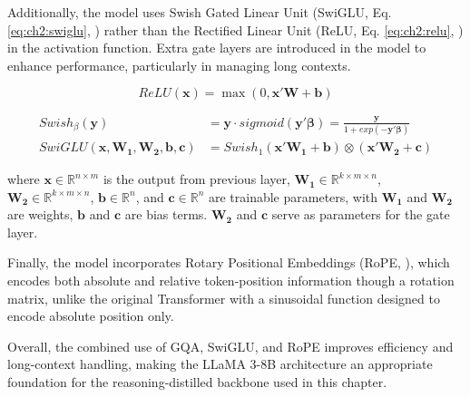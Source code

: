 Additionally, the model uses Swish Gated Linear Unit (SwiGLU, Eq. \eqref{eq:ch2:swiglu}, \cite{shazeer2020glu}) rather than the Rectified Linear Unit (ReLU, Eq. \eqref{eq:ch2:relu}, \cite{glorot2011deep}) in the activation function. Extra gate layers are introduced in the model to enhance performance, particularly in managing long contexts.



\begin{equation}\label{eq:ch2:relu}
    ReLU (\mathbf {x} )=\max(0,\mathbf {x} '\mathbf{W} + \mathbf{b})
\end{equation}


\begin{equation}\label{eq:ch2:swiglu}
    \begin{split}
        Swish_{\beta}(\mathbf{y}) &= \mathbf{y} \cdot sigmoid(\mathbf{y}' \mathbf{\beta}) = \frac{\mathbf{y}}{1 + exp(-\mathbf{y}' \mathbf{\beta})} \\
        SwiGLU(\mathbf{x}, \mathbf{W_1}, \mathbf{W_2}, \mathbf{b}, \mathbf{c}) &= Swish_{1}(\mathbf{x}' \mathbf{W_1} + \mathbf{b}) \otimes (\mathbf{x}' \mathbf{W_2} + \mathbf{c})
    \end{split}
\end{equation}


where $\mathbf{x} \in \mathbb{R}^{n \times m}$ is the output from previous layer, $\mathbf{W_1} \in \mathbb{R}^{k \times m \times n}$, $\mathbf{W_2} \in \mathbb{R}^{k \times m \times n}$, $\mathbf{b} \in \mathbb{R}^{n}$, and $\mathbf{c} \in \mathbb{R}^{n}$ are trainable parameters, with $\mathbf{W_1}$ and $\mathbf{W_2}$ are weights, $\mathbf{b}$ and $\mathbf{c}$ are bias terms. $\mathbf{W_2}$ and $\mathbf{c}$ serve as parameters for the gate layer.






Finally, the model incorporates Rotary Positional Embeddings (RoPE, \cite{su2024roformer}), which encodes both absolute and relative token-position information though a rotation matrix, unlike the original Transformer with a sinusoidal function designed to encode absolute position only.


Overall, the combined use of GQA, SwiGLU, and RoPE improves efficiency and long-context handling, making the LLaMA 3-8B architecture an appropriate foundation for the reasoning-distilled backbone used in this chapter.


